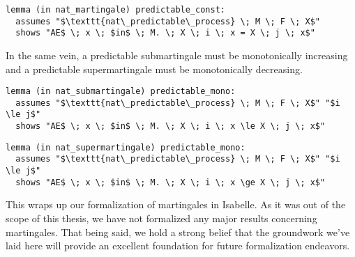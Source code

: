 \begin{isalemma}
{\small
\begin{lstlisting}[style=isabelle]
lemma (in nat_martingale) predictable_const:
  assumes "$\texttt{nat\_predictable\_process} \; M \; F \; X$"
  shows "AE$ \; x \; $in$ \; M. \; X \; i \; x = X \; j \; x$"
\end{lstlisting}
}
\end{isalemma}

In the same vein, a predictable submartingale must be monotonically increasing and a predictable supermartingale must be monotonically decreasing.

\begin{isalemma}
{\small
\begin{lstlisting}[style=isabelle]
lemma (in nat_submartingale) predictable_mono:
  assumes "$\texttt{nat\_predictable\_process} \; M \; F \; X$" "$i \le j$"
  shows "AE$ \; x \; $in$ \; M. \; X \; i \; x \le X \; j \; x$"
\end{lstlisting}
}
\end{isalemma}

\begin{isalemma}
{\small
\begin{lstlisting}[style=isabelle]
lemma (in nat_supermartingale) predictable_mono:
  assumes "$\texttt{nat\_predictable\_process} \; M \; F \; X$" "$i \le j$"
  shows "AE$ \; x \; $in$ \; M. \; X \; i \; x \ge X \; j \; x$"
\end{lstlisting}
}
\end{isalemma}

This wraps up our formalization of martingales in Isabelle. As it was out of the scope of this thesis, we have not formalized any major results concerning martingales. That being said, we hold a strong belief that the groundwork we've laid here will provide an excellent foundation for future formalization endeavors.